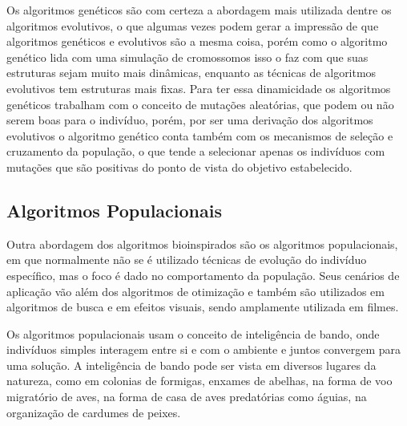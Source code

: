         Os algoritmos genéticos são com certeza a abordagem mais utilizada dentre os algoritmos evolutivos, o que algumas vezes podem gerar a impressão de que algoritmos genéticos e evolutivos são a mesma coisa, porém como o algoritmo genético lida com uma simulação de cromossomos isso o faz com que suas estruturas sejam muito mais dinâmicas, enquanto as técnicas de algoritmos evolutivos tem estruturas mais fixas.\newline
        Para ter essa dinamicidade os algoritmos genéticos trabalham com o conceito de mutações aleatórias, que podem ou não serem boas para o indivíduo, porém, por ser uma derivação dos algoritmos evolutivos o algoritmo genético conta também com os mecanismos de seleção e cruzamento da população, o que tende a selecionar apenas os indivíduos com mutações que são positivas do ponto de vista do objetivo estabelecido.


    \subsection{Algoritmos Populacionais}
        Outra abordagem dos algoritmos bioinspirados são os algoritmos populacionais, em que normalmente não se é utilizado técnicas de evolução do indivíduo específico, mas o foco é dado no comportamento da população.\newline
        Seus cenários de aplicação vão além dos algoritmos de otimização e também são utilizados em algoritmos de busca e em efeitos visuais, sendo amplamente utilizada em filmes.\newline
        
        Os algoritmos populacionais usam o conceito de inteligência de bando, onde indivíduos simples interagem entre si e com o ambiente e juntos convergem para uma solução.\newline
        A inteligência de bando pode ser vista em diversos lugares da natureza, como em colonias de formigas, enxames de abelhas, na forma de voo migratório de aves, na forma de casa de aves predatórias como águias, na organização de cardumes de peixes.\newline

